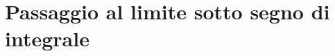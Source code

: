 \documentclass[a4paper, 11pt, twoside, openright, italian]{memoir}
\begin{document}
\frontmatter




\mainmatter

\part{Passaggio al limite sotto segno di integrale}

%
%
%
%
%
%
%
%
%
%
%
%
%
%
%
\backmatter

\end{document}
